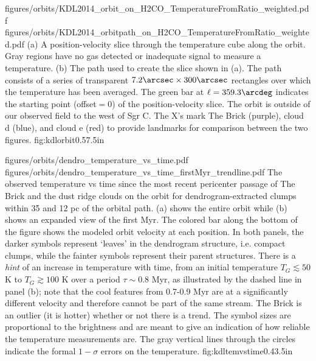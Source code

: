 \RotFigureTwoAA
{figures/orbits/KDL2014_orbit_on_H2CO_TemperatureFromRatio_weighted.pdf}
{figures/orbits/KDL2014_orbitpath_on_H2CO_TemperatureFromRatio_weighted.pdf}
{(a) A position-velocity slice through the temperature cube along the
\citet{Kruijssen2015a} orbit.  
Gray regions have no gas detected or inadequate signal to measure a
temperature.
(b) The path used to create the slice shown in (a).  The path consists of a series
of transparent $7.2\arcsec\times300\arcsec$
rectangles over which the temperature has been averaged.  The green bar at
$\ell=359.3\arcdeg$ indicates the starting point (offset$=0$) of the position-velocity
slice.  The orbit is outside of our observed field to the west of Sgr C.  
The X's mark The Brick (purple), cloud d (blue), and cloud e (red) to provide
landmarks for comparison between the two figures.
}
{fig:kdlorbit}{0.5}{7.5in}

\FigureTwo
{figures/orbits/dendro_temperature_vs_time.pdf}
{figures/orbits/dendro_temperature_vs_time_firstMyr_trendline.pdf}
{The observed temperature vs time since the most recent pericenter passage of
The Brick and the dust ridge clouds on the \citet{Kruijssen2015a} orbit for
dendrogram-extracted clumps within 35 \kms and 12 pc of the orbital path.  
(a) shows the entire orbit
while (b) shows an expanded
view of the first Myr.  The colored bar along the bottom of the figure shows the
modeled orbit velocity at each position.
In both panels,
the darker symbols represent `leaves'
in the dendrogram structure, i.e. compact clumps, while the fainter symbols
represent their parent structures. There is a \emph{hint} of an 
increase in temperature with time, from an initial temperature $T_G\lesssim50$ K
to $T_G\gtrsim100$ K over a period $\tau\sim0.8$ Myr, as illustrated by the
dashed line in panel (b); note that the cool features from 0.7-0.9 Myr are
at a significantly different velocity and therefore cannot be part of the same
stream.  The Brick is an outlier (it is hotter) whether or not there is a
trend.  The symbol sizes are proportional to the \para \threetwoone brightness
and are meant to give
an indication of how reliable the temperature measurements are.  The gray
vertical lines through the circles indicate the formal $1-\sigma$ errors on the
temperature.
}
{fig:kdltemvstime}{0.4}{3.5in}

